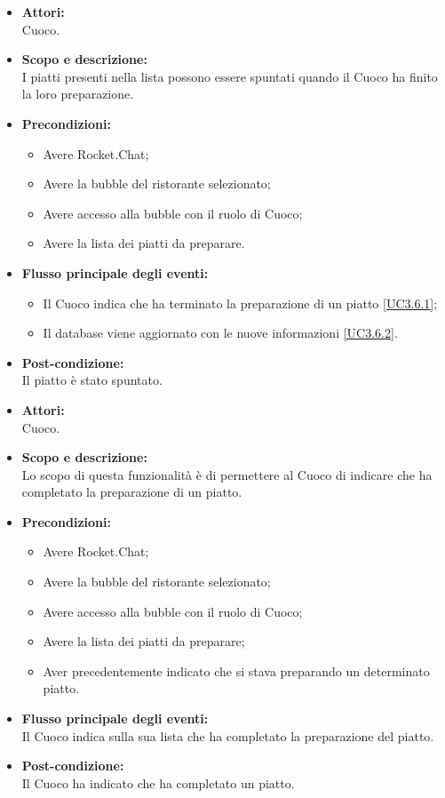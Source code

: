 \begin{itemize}
	\item \textbf{Attori:}
	\\Cuoco.
	\item \textbf{Scopo e descrizione:} 
	\\I piatti presenti nella lista possono essere spuntati quando il Cuoco ha finito la loro preparazione.
	\item \textbf{Precondizioni:}
	\begin{itemize}
		\item Avere Rocket.Chat;
		\item Avere la bubble del ristorante selezionato;
		\item Avere accesso alla bubble con il ruolo di Cuoco;
		\item Avere la lista dei piatti da preparare.
	\end{itemize}
	\item \textbf{Flusso principale degli eventi:}
	\begin{itemize}
		\item Il Cuoco indica che ha terminato la preparazione di un piatto \ref{UC3.6.1};
		\item Il database viene aggiornato con le nuove informazioni \ref{UC3.6.2}.
	\end{itemize}
	\item \textbf{Post-condizione:}
	\\Il piatto è stato spuntato.
\end{itemize}


\begin{itemize}
	\item \textbf{Attori:}
	\\Cuoco.
	\item \textbf{Scopo e descrizione:} 
	\\Lo scopo di questa funzionalità è di permettere al Cuoco di indicare che ha completato la preparazione di un piatto.
	\item \textbf{Precondizioni:}
	\begin{itemize}
		\item Avere Rocket.Chat;
		\item Avere la bubble del ristorante selezionato;
		\item Avere accesso alla bubble con il ruolo di Cuoco;
		\item Avere la lista dei piatti da preparare;
		\item Aver precedentemente indicato che si stava preparando un determinato piatto.
	\end{itemize}
	\item \textbf{Flusso principale degli eventi:}
	\\Il Cuoco indica sulla sua lista che ha completato la preparazione del piatto.
	\item \textbf{Post-condizione:}
	\\Il Cuoco ha indicato che ha completato un piatto.
\end{itemize}

